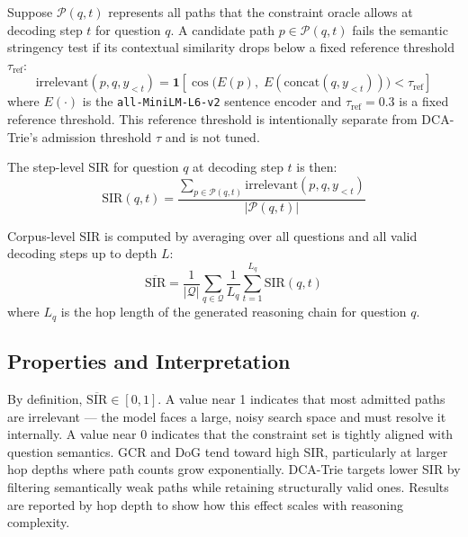 Suppose $\mathcal{P}(q, t)$ represents all paths that the constraint oracle allows at decoding step $t$ for question $q$. A candidate path $p \in \mathcal{P}(q, t)$ fails the semantic stringency test if its contextual similarity drops below a fixed reference threshold $\tau_{\text{ref}}$:
\begin{equation}
  \text{irrelevant}(p, q, y_{<t}) = \mathbf{1}\!\left[
    \cos\!\bigl(E(p),\; E(\text{concat}(q, y_{<t}))\bigr) < \tau_{\text{ref}}
    \right]
  \label{eq:irrelevant}
\end{equation}
where $E(\cdot)$ is the \texttt{all-MiniLM-L6-v2} sentence encoder and $\tau_{\text{ref}} = 0.3$ is a fixed reference threshold. This reference threshold is intentionally separate from DCA-Trie's admission threshold $\tau$ and is not tuned.

The step-level SIR for question $q$ at decoding step $t$ is then:
\begin{equation}
  \text{SIR}(q, t) = \frac{\sum_{p \in \mathcal{P}(q,t)}
    \text{irrelevant}(p, q, y_{<t})}{|\mathcal{P}(q, t)|}
  \label{eq:sir_step}
\end{equation}

Corpus-level SIR is computed by averaging over all questions and all valid decoding steps up to depth $L$:
\begin{equation}
  \overline{\text{SIR}} = \frac{1}{|\mathcal{Q}|} \sum_{q \in \mathcal{Q}}
  \frac{1}{L_q} \sum_{t=1}^{L_q} \text{SIR}(q, t)
  \label{eq:sir_aggregate}
\end{equation}
where $L_q$ is the hop length of the generated reasoning chain for question $q$.

\subsection{Properties and Interpretation}

By definition, $\overline{\text{SIR}} \in [0,1]$. A value near 1 indicates that most admitted paths are irrelevant — the model faces a large, noisy search space and must resolve it internally. A value near 0 indicates that the constraint set is tightly aligned with question semantics. GCR and DoG tend toward high SIR, particularly at larger hop depths where path counts grow exponentially. DCA-Trie targets lower SIR by filtering semantically weak paths while retaining structurally valid ones. Results are reported by hop depth to show how this effect scales with reasoning complexity.

